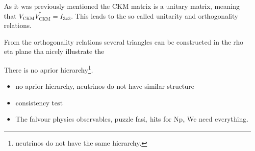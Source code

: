 \noindent As it was previously mentioned the CKM matrix is a unitary matrix, meaning that $V_{\text{CKM}} V_{\text{CKM}}^\dagger = I_{3x3}$.
This leads to the so called unitarity and orthogonality relations.

From the orthogonality relations several triangles can be constructed in the rho eta plane
tha nicely illustrate the


There is no aprior hierarchy\footnote{neutrinos do not have the same hierarchy.}.


\begin{itemize}
  \item no aprior hierarchy, neutrinos do not have similar structure
  \item consistency test
  \item The falvour physics observables, puzzle fasi, hits for Np, We need everything.
\end{itemize}
